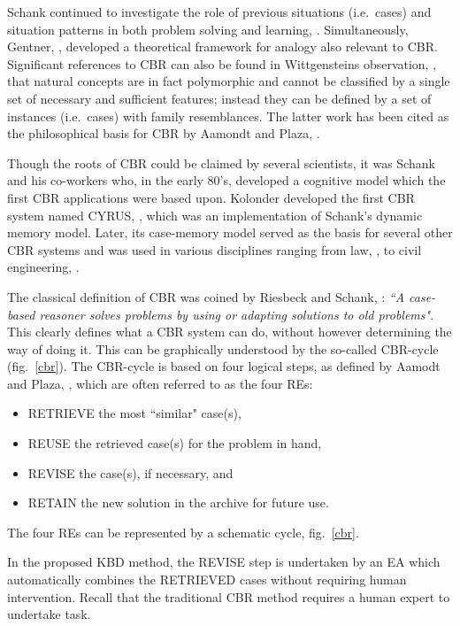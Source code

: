 Schank continued to investigate the role of previous situations (i.e.\ cases) 
and situation patterns in both problem solving and learning, \cite{Schank_1982}.  
Simultaneously, Gentner, \cite{genter_1983}, developed a  
theoretical framework for analogy also relevant to CBR. Significant references to CBR can also be found in 
Wittgensteins observation, \cite{wittgestein_1953}, that natural concepts are in fact 
polymorphic and cannot be classified by a single set of necessary and sufficient 
features; instead they can be defined by a set of instances (i.e.\ cases) with family 
resemblances. The latter work has been cited as the philosophical basis for CBR by Aamondt and Plaza, \cite{aamond_plaza_1994}.

Though the roots of CBR could be claimed by several scientists, it was Schank and his co-workers who, in the early 80's, developed a cognitive model which the first CBR applications were based upon. Kolonder developed the first CBR system named CYRUS, \cite{kolodner_1983a,kolodner_1983b}, which was an implementation of Schank's dynamic memory model. Later, its case-memory model served as the basis for several other CBR systems and was used in various disciplines ranging from law, \cite{ashley_1988,rissland_skalak_1989}, to civil engineering, \cite{whatson_abdullah_1994,moore_1994}.

\label {CBR}  The classical definition of CBR was coined by Riesbeck and Schank, \cite{riesbeck_1989}: \textit{``A case-based reasoner solves problems by using or adapting solutions to old problems"}. This clearly defines what a CBR system can do, without however determining the way of doing it. This can be graphically understood by the so-called CBR-cycle (fig.\ \ref{cbr}).  The CBR-cycle is based on four logical steps, as defined by Aamodt and Plaza, \cite{aamond_plaza_1994}, which are often referred to as the four REs: 

\begin{itemize}
  \item RETRIEVE the most ``similar" case(s),
  \item REUSE the retrieved case(s) for the problem in hand,
  \item REVISE the case(s), if necessary, and
  \item RETAIN the new solution in the archive for future use.
\end{itemize}
The four REs can be represented by a schematic cycle, fig.\ \ref{cbr}.

In the proposed KBD method, the REVISE step is undertaken by an EA which automatically combines the RETRIEVED cases without requiring human intervention. Recall that the traditional CBR method requires a human expert to undertake task.  

